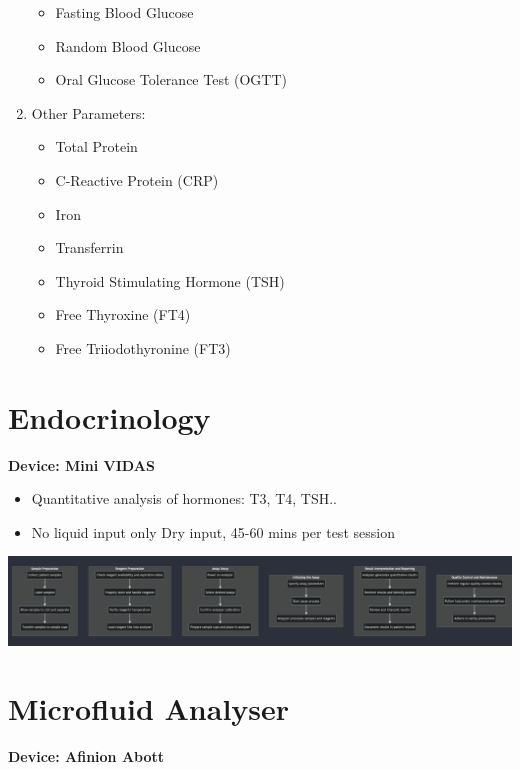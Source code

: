 \documentclass[
  11pt,
  letterpaper,
  DIV=11,
  numbers=noendperiod]{scrreprt}
\providecommand{\tightlist}{%
  \setlength{\itemsep}{0pt}\setlength{\parskip}{0pt}}\usepackage{longtable,booktabs,array}
\begin{document}
\begin{enumerate}
  \begin{itemize}
  \tightlist
  \item
    Fasting Blood Glucose
  \item
    Random Blood Glucose
  \item
    Oral Glucose Tolerance Test (OGTT)
  \end{itemize}
\item
  Other Parameters:

  \begin{itemize}
  \tightlist
  \item
    Total Protein
  \item
    C-Reactive Protein (CRP)
  \item
    Iron
  \item
    Transferrin
  \item
    Thyroid Stimulating Hormone (TSH)
  \item
    Free Thyroxine (FT4)
  \item
    Free Triiodothyronine (FT3)
  \end{itemize}
\end{enumerate}

\section{Endocrinology}\label{endocrinology}

\textbf{Device: Mini VIDAS}

\begin{itemize}
\tightlist
\item
  Quantitative analysis of hormones: T3, T4, TSH..
\item
  No liquid input only Dry input, 45-60 mins per test session
\end{itemize}

\includegraphics{Beyond the Sterile Walls e0cff5645ec24545a8c247940fff8e84/Untitled 9.png}

\section{Microfluid Analyser}\label{microfluid-analyser}

\textbf{Device: Afinion Abott}
\end{document}
